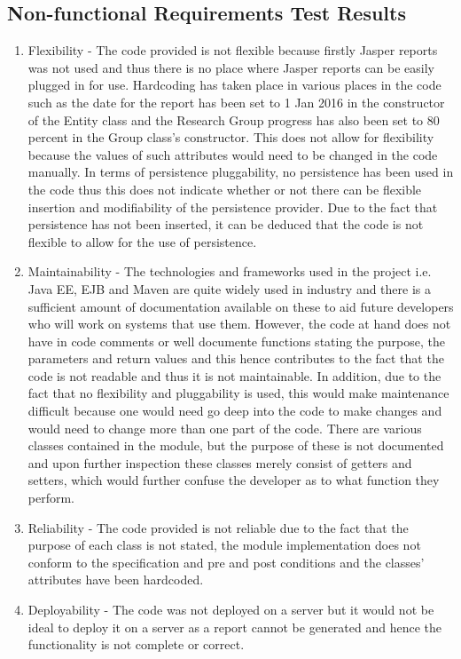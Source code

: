 \subsection{Non-functional Requirements Test Results}
\begin{enumerate} 
\item Flexibility - The code provided is not flexible because firstly Jasper reports was not used and thus there is no place where Jasper reports can be easily plugged in for use. Hardcoding has taken place in various places in the code such as the date for the report has been set to 1 Jan 2016 in the constructor of the Entity class and the Research Group progress has also been set to 80 percent in the Group class's constructor. This does not allow for flexibility because the values of such attributes would need to be changed in the code manually. In terms of persistence pluggability, no persistence has been used in the code thus this does not indicate whether or not there can be flexible insertion and modifiability of the persistence provider. Due to the fact that persistence has not been inserted, it can be deduced that the code is not flexible to allow for the use of persistence.
\item Maintainability - The technologies and frameworks used in the project i.e. Java EE, EJB and Maven are quite widely used in industry and there is a sufficient amount of documentation available on these to aid future developers who will work on systems that use them. However, the code at hand does not have in code comments or well documente functions stating the purpose, the parameters and return values and this hence contributes to the fact that the code is not readable and thus it is not maintainable. In addition, due to the fact that no flexibility and pluggability is used, this would make maintenance difficult because one would need go deep into the code to make changes and would need to change more than one part of the code. There are various classes contained in the module, but the purpose of these is not documented and upon further inspection these classes merely consist of getters and setters, which would further confuse the developer as to what function they perform. 
\item Reliability - The code provided is not reliable due to the fact that the purpose of each class is not stated, the module implementation does not conform to the specification and pre and post conditions and the classes' attributes have been hardcoded.
\item Deployability - The code was not deployed on a server but it would not be ideal to deploy it on a server as a report cannot be generated and hence the functionality is not complete or correct. 
\end{enumerate}
